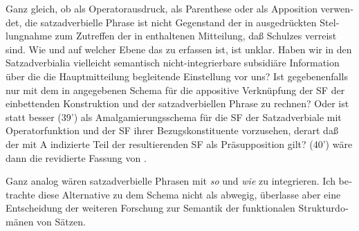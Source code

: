\documentclass[output=paper, colorlinks, citecolor=brown, booklanguage=german]{langscibook}
\begin{document}
\begin{otherlanguage}{german}
\noindent Ganz gleich, ob als Operatorausdruck, als Parenthese oder als Apposition verwendet, die satzadverbielle Phrase ist nicht Gegenstand der in  ausgedrückten Stellungnahme zum Zutreffen der in  enthaltenen Mitteilung, daß Schulzes verreist sind. Wie und auf welcher Ebene das zu erfassen ist, ist unklar. Haben wir in den Satzadverbialia vielleicht semantisch nicht-integrierbare subsidiäre Information über die die Hauptmitteilung begleitende Einstellung vor uns? Ist gegebenenfalls nur mit dem in  angegebenen Schema für die appositive Verknüpfung der SF der einbettenden Konstruktion und der satzadverbiellen Phrase zu rechnen? Oder ist statt  besser (39') als Amalgamierungsschema für die SF der Satzadverbiale mit Operatorfunktion und der SF ihrer Bezugskonstituente vorzusehen, derart daß der mit A indizierte Teil der resultierenden SF als Präsupposition gilt?  (40') wäre dann die revidierte Fassung von .


\begin{exe}
\end{exe}

\noindent Ganz analog wären satzadverbielle Phrasen mit \textit{so} und \textit{wie} zu integrieren. Ich betrachte diese Alternative zu dem Schema  nicht als abwegig, überlasse aber eine Entscheidung der weiteren Forschung zur Semantik der funktionalen Strukturdomänen von Sätzen.


\end{otherlanguage}
\end{document}

